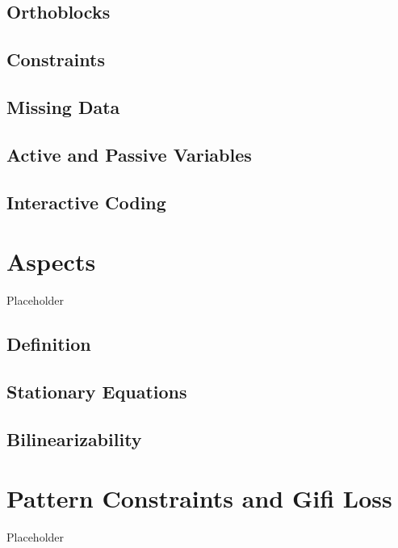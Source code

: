 \documentclass[
  12pt,
]{book}
\begin{document}
\section{Orthoblocks}\label{orthoblocks}

\section{Constraints}\label{constraints}

\section{Missing Data}\label{missing-data}

\section{Active and Passive Variables}\label{active-and-passive-variables}

\section{Interactive Coding}\label{interactive-coding}

\chapter{Aspects}\label{aspects}

Placeholder

\section{Definition}\label{definition}

\section{Stationary Equations}\label{stationary-equations}

\section{Bilinearizability}\label{bilinearizability}

\chapter{Pattern Constraints and Gifi Loss}\label{pattern-constraints-and-gifi-loss}

Placeholder
\end{document}
